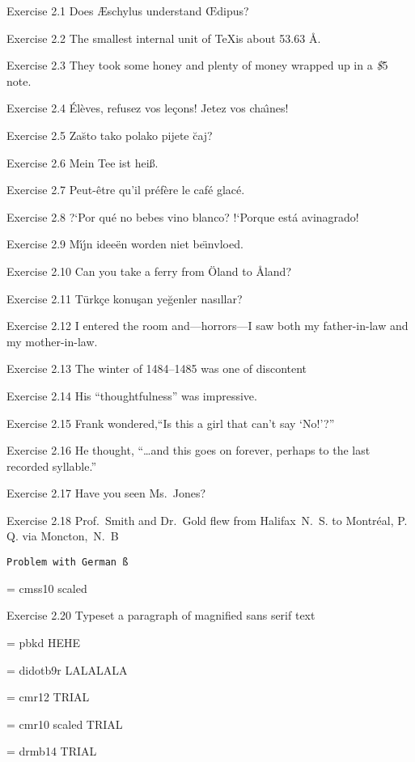 Exercise 2.1 Does \AE schylus understand \OE dipus?

Exercise 2.2 The smallest internal unit of \TeX is about 53.63 \AA.

Exercise 2.3 They took some honey and plenty of money wrapped up in a {\it\$}5 note.\par
Exercise 2.4 \'El\`eves, refusez vos le\c cons! Jetez vos cha\^\i nes!

Exercise 2.5 Za\u sto tako polako pijete \u caj?

Exercise 2.6 Mein Tee ist hei\ss.

Exercise 2.7 Peut-\^etre qu'il pr\'ef\`ere le caf\'e glac\'e.

Exercise 2.8 ?`Por qu\'e no bebes vino blanco? !`Porque est\'a avinagrado!

Exercise 2.9 M\'\i \'\j n idee\"en worden niet be\"\i nvloed.

Exercise 2.10 Can you take a ferry from \"Oland to \AA land?

Exercise 2.11 T\"urk\c ce konu\c san ye\u genler nas\i llar?

Exercise 2.12 I entered the room and---horrors---I saw both my father-in-law and my
mother-in-law.

Exercise 2.13 The winter of 1484--1485 was one of discontent

Exercise 2.14 His ``thoughtfulness'' was impressive.

Exercise 2.15 Frank wondered,``Is this a girl that can't say `No!'?''

Exercise 2.16 He thought, ``\dots and this goes on forever, perhaps to the last recorded syllable.''

Exercise 2.17 Have you seen Ms.~Jones?

Exercise 2.18 Prof.~Smith and Dr.~Gold flew from Halifax~N.~S. to Montr\'eal, P. Q. via Moncton,~N.~B


\tt Problem with German \ss

\font\sf = cmss10 scaled 

\sf Exercise 2.20 Typeset a paragraph of magnified sans serif text

\font\pbkd = pbkd
\pbkd HEHE

\font\didot = didotb9r
\didot LALALALA

\font\cmr = cmr12
\cmr TRIAL \par

\font\cmrr = cmr10 scaled 
\cmrr TRIAL 

\font\drfont = drmb14 
\drfont TRIAL

\bye
